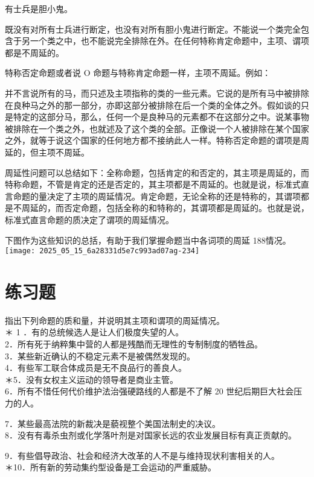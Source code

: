 有士兵是胆小鬼。

既没有对所有士兵进行断定，也没有对所有胆小鬼进行断定。不能说一个类完全包含于另一个类之中，也不能说完全排除在外。在任何特称肯定命题中，主项、谓项都是不周延的。

特称否定命题或者说 O 命题与特称肯定命题一样，主项不周延。例如：

并不言说所有的马，而只述及主项指称的类的一些元素。它说的是所有马中被排除在良种马之外的那一部分，亦即这部分被排除在后一个类的全体之外。假如谈的只是特定的这部分马，那么，任何一个是良种马的元素都不在这部分之中。说某事物被排除在一个类之外，也就述及了这个类的全部。正像说一个人被排除在某个国家之外，就等于说这个国家的任何地方都不接纳此人一样。特称否定命题的谓项是周延的，但主项不周延。

周延性问题可以总结如下：全称命题，包括肯定的和否定的，其主项是周延的，而特称命题，不管是肯定的还是否定的，其主项都是不周延的。也就是说，标准式直言命题的量决定了主项的周延情况。肯定命题，无论全称的还是特称的，其谓项都是不周延的，而否定命题，包括全称的和特称的，其谓项都是周延的。也就是说，标准式直言命题的质决定了谓项的周延情况。

下图作为这些知识的总括，有助于我们掌握命题当中各词项的周延 188情况。\\
\texttt{[image: 2025\_05\_15\_6a28331d5e7c993ad07ag-234]}

\section*{练习题}
指出下列命题的质和量，并说明其主项和谓项的周延情况。\\
＊ 1 ．有的总统候选人是让人们极度失望的人。\\
2．所有死于纳粹集中营的人都是残酷而无理性的专制制度的牺牲品。\\
3．某些新近确认的不稳定元素不是被偶然发现的。\\
4．有些军工联合体成员是无不良品行的善良人。\\
＊5．没有女权主义运动的领导者是商业主管。\\
6．所有不惜任何代价维护法治强硬路线的人都是不了解 20 世纪后期巨大社会压力的人。

7．某些最高法院的新裁决是藐视整个美国法制史的决议。\\
8．没有有毒杀虫剂或化学落叶剂是对国家长远的农业发展目标有真正贡献的。

9．有些倡导政治、社会和经济大改革的人不是与维持现状利害相关的人。\\
＊10．所有新的劳动集约型设备是工会运动的严重威胁。

